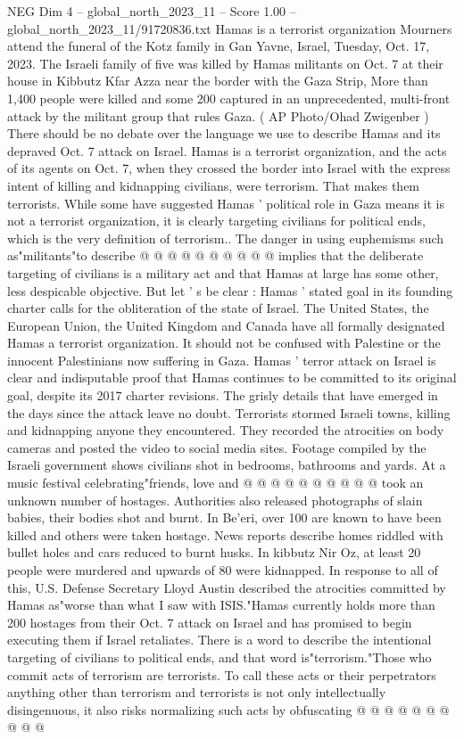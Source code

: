 \begin{textsample}{NEG Dim 4 – global\_north\_2023\_11 – Score 1.00 – global\_north\_2023\_11/91720836.txt}  \label{ex:f4_neg_185}
Hamas is a terrorist organization Mourners attend the funeral of the Kotz family in Gan Yavne, Israel, Tuesday, Oct. 17, 2023.
The Israeli family of five was killed by Hamas militants on Oct. 7 at their house in Kibbutz Kfar Azza near the border with the Gaza Strip, More than 1,400 people were killed and some 200 captured in an unprecedented, multi-front attack by the militant group that rules Gaza. ( AP Photo/Ohad Zwigenber ) There should be no debate over the language we use to describe Hamas and its depraved Oct. 7 attack on Israel.
Hamas is a terrorist organization, and the acts of its agents on Oct. 7, when they crossed the border into Israel with the express intent of killing and kidnapping civilians, were terrorism.
That makes them terrorists.
While some have suggested Hamas ' political role in Gaza means it is not a terrorist organization, it is clearly targeting civilians for political ends, which is the very definition of terrorism..
The danger in using euphemisms such as"militants"to describe @ @ @ @ @ @ @ @ @ @ implies that the deliberate targeting of civilians is a military act and that Hamas at large has some other, less despicable objective.
But let ' s be clear : Hamas ' stated goal in its founding charter calls for the obliteration of the state of Israel.
The United States, the European Union, the United Kingdom and Canada have all formally designated Hamas a terrorist organization.
It should not be confused with Palestine or the innocent Palestinians now suffering in Gaza.
Hamas ' terror attack on Israel is clear and indisputable proof that Hamas continues to be committed to its original goal, despite its 2017 charter revisions.
The grisly details that have emerged in the days since the attack leave no doubt.
Terrorists stormed Israeli towns, killing and kidnapping anyone they encountered.
They recorded the atrocities on body cameras and posted the video to social media sites.
Footage compiled by the Israeli government shows civilians shot in bedrooms, bathrooms and yards.
At a music festival celebrating"friends, love and @ @ @ @ @ @ @ @ @ @ took an unknown number of hostages.
Authorities also released photographs of slain babies, their bodies shot and burnt.
In Be'eri, over 100 are known to have been killed and others were taken hostage.
News reports describe homes riddled with bullet holes and cars reduced to burnt husks.
In kibbutz Nir Oz, at least 20 people were murdered and upwards of 80 were kidnapped.
In response to all of this, U.S.
Defense Secretary Lloyd Austin described the atrocities committed by Hamas as"worse than what I saw with ISIS."Hamas currently holds more than 200 hostages from their Oct. 7 attack on Israel and has promised to begin executing them if Israel retaliates.
There is a word to describe the intentional targeting of civilians to political ends, and that word is"terrorism."Those who commit acts of terrorism are terrorists.
To call these acts or their perpetrators anything other than terrorism and terrorists is not only intellectually disingenuous, it also risks normalizing such acts by obfuscating @ @ @ @ @ @ @ @ @ @

\end{textsample}
